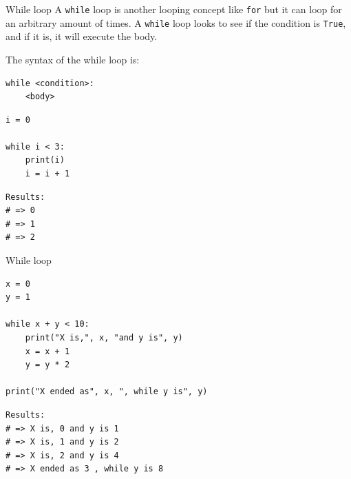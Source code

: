 \documentclass[10pt]{beamer}
\begin{document}
\begin{frame}[label={sec:orgcad998d},fragile]{While loop}
 A \texttt{while} loop is another looping concept like \texttt{for} but it can loop for an arbitrary
amount of times. A \texttt{while} loop looks to see if the condition is \texttt{True}, and if it is, it
will execute the body.

The syntax of the while loop is:

\begin{verbatim}
while <condition>:
    <body>
\end{verbatim}

\begin{verbatim}
i = 0

while i < 3:
    print(i)
    i = i + 1
\end{verbatim}

\begin{verbatim}
Results: 
# => 0
# => 1
# => 2
\end{verbatim}
\end{frame}

\begin{frame}[label={sec:orga8323fa},fragile]{While loop}
 \begin{verbatim}
x = 0
y = 1

while x + y < 10:
    print("X is,", x, "and y is", y)
    x = x + 1
    y = y * 2

print("X ended as", x, ", while y is", y)
\end{verbatim}

\begin{verbatim}
Results: 
# => X is, 0 and y is 1
# => X is, 1 and y is 2
# => X is, 2 and y is 4
# => X ended as 3 , while y is 8
\end{verbatim}
\end{frame}
\end{document}
